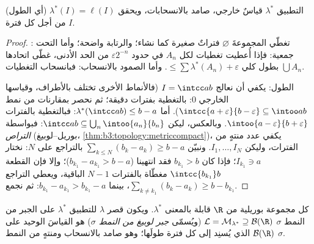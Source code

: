\begin{lemma}\label{lem:b3:measure:outerbasics}
التطبيق $\lambda^*$ قياسٌ خارجي، صامد بالانسحابات، ويحقق $\lambda^*(I) = \ell(I)$
(أي الطول) من أجل كل فترة $I$.
\end{lemma}

\begin{proof}
: تغطّي المجموعةَ $\varnothing$ فتراتٌ صغيرة كما نشاء؛
والرتابة واضحة؛ وأما التحت جمعية: فإذا أُعطيت تغطيات لكل $A_n$
في حدود $\varepsilon 2^{-n}$ من الحد الأدنى، غطّى اتحادها $\bigcup A_n$ بطول
كلي $\leq \sum
\lambda^*(A_n) + \varepsilon$. وأما الصمود بالانسحاب: فبانسحاب التغطيات.

الطول: يكفي أن نعالج $I = \intcc ab$ (فالأنماط الأخرى تختلف
بالأطراف، وقياسها الخارجي $0$: بالتغطية بفترات دقيقة؛ ثم نحصر
بمقارنات من نمط $\intcc{a+\varepsilon}{b -
\varepsilon} \subseteq \intoo ab$). أما $\lambda^*(\intcc ab) \leq b - a$: فبالتغطية بالفترات $\intoo{a-\varepsilon}{b+\varepsilon}$.
وبالعكس، ليكن $\intcc
ab \subseteq \bigcup_n\intoo{a_n}{b_n}$: فبواسطة \emph{التراص} (بوريل--لوبيغ،
\cref{thm:b3:topology:metriccompact})، يكفي عدد منتهٍ من الفترات، وليكن $I_1, \dots, I_N$. ونبيّن
$\sum_{k\leq N}(b_k -
a_k) \geq b - a$ بالتراجع على $N$: نختار $I_{k_1} \ni a$؛ فإذا كان
$b_{k_1} > b$ فقد انتهينا ($b_{k_1} - a_{k_1} > b - a$)؛ وإلا فإن القطعة $\intcc{b_{k_1}}b$
مغطّاة بالفترات $N - 1$ الباقية، ويعطي التراجع $\sum_{k \neq k_1}(b_k - a_k)
\geq b - b_{k_1}$، بينما
$b_{k_1} - a_{k_1} > b_{k_1} - a$: ثم نجمع.
\end{proof}

\begin{theorem}\label{thm:b3:measure:lebesgue}
كل مجموعة بوريلية من $\R$ قابلة  بالمعنى $\lambda^*$.
ويكون قصر $\lambda$ للتطبيق $\lambda^*$ على الجبر من النمط
$\sigma$
$\mathcal L = \mathcal M_{\lambda^*} \supseteq \mathcal B(\R)$
(ويُسمّى \emph{جبر لوبيغ من النمط $\sigma$}) هو القياسَ الوحيد
على $\mathcal B(\R)$ الذي يُسنِد إلى كل فترة طولَها؛ وهو صامد
بالانسحاب ومنتهٍ من النمط $\sigma$.
\end{theorem}


